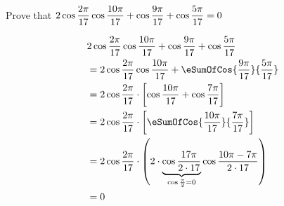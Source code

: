 \question[4] Prove that $2\cos\dfrac{2\pi}{17}\cos\dfrac{10\pi}{17} + 
\cos\dfrac{9\pi}{17} + \cos\dfrac{5\pi}{17} = 0 $

\watchout

\ifprintanswers
\fi 

\begin{solution}[\halfpage]
     \begin{align}
     	&2\cos\dfrac{\vbfive\pi}{\vbone}\cos\dfrac{\vbtwo\pi}{\vbone} + 
     	\cos\dfrac{\vbthree\pi}{\vbone} + \cos\dfrac{\vbfour\pi}{\vbone} \nonumber \\
     	&= 2\cos\dfrac{\vbfive\pi}{\vbone}\cos\dfrac{\vbtwo\pi}{\vbone} + 
     	\eSumOfCos{\frac{\vbthree\pi}{\vbone}}{\frac{\vbfour\pi}{\vbone}} \\
     	&= 2\cos\dfrac{\vbfive\pi}{\vbone}\cdot\left[ \cos\dfrac{\vbtwo\pi}{\vbone} + \cos\dfrac{\vbsix\pi}{\vbone}\right] \\
     	&= 2\cos\dfrac{\vbfive\pi}{\vbone}\cdot\left[ \eSumOfCos{\frac{\vbtwo\pi}{\vbone}}{\frac{\vbsix\pi}{\vbone}} \right] \\
     	&= 2\cos\dfrac{\vbfive\pi}{\vbone}\cdot
     	\left( 2\cdot\underbrace{\cos\dfrac{\vbone\pi}{2\cdot\vbone}}_{\cos\frac{\pi}{2} = 0}
     	\cos\dfrac{\vbtwo\pi-\vbsix\pi}{2\cdot\vbone}\right) \\
        &= 0
     \end{align}
\end{solution}
